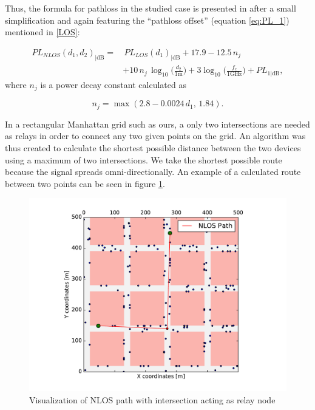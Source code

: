 Thus, the formula for pathloss in the studied case is presented in \cite{Raschkowski} after a small simplification and again featuring the ``pathloss offset'' (equation \ref{eq:PL_1}) mentioned in \ref{LOS}:

\begin{equation} \label{eq:NLOS}
\begin{split}
  PL_{NLOS}(d_1,d_2)_{|\text{dB}} = & \,PL_{LOS}(d_1)_{|\text{dB}} + 17.9 - 12.5\,n_j \\
  & + 10\,n_j\,\log_{10} \bigg( \frac {d_2} {1 \text{m}} \bigg) + 3 \log_{10} \bigg( \frac { f_c } { 1 \text{GHz} } \bigg) + PL_{1|\text{dB}},
\end{split}
\end{equation}
where $n_j$ is a power decay constant calculated as

\begin{equation} \label{eq:n_j}
n_j = \max (2.8 - 0.0024\,d_1,\,1.84).
\end{equation}

In a rectangular Manhattan grid such as ours, a only two intersections are needed as relays in order to connect any two given points on the grid. An algorithm was thus created to calculate the shortest possible distance between the two devices using a maximum of two intersections. We take the shortest possible route because the signal spreads omni-directionally. An example of a calculated route between two points can be seen in figure \ref{fig:two_points}.

\begin{figure}[H]
\centering
\includegraphics[width=.7\linewidth]{figures/two_points}
\caption{Visualization of NLOS path with intersection acting as relay node}
\label{fig:two_points}
\end{figure}

